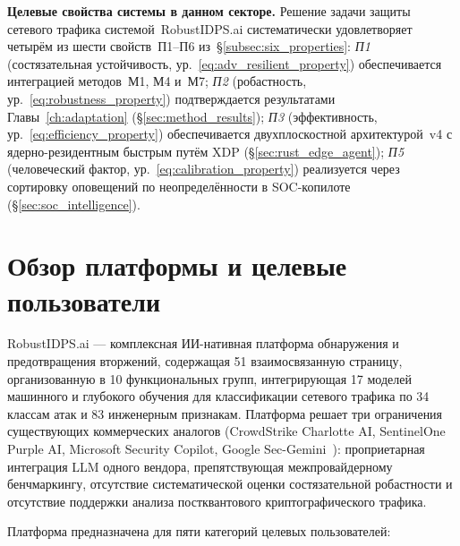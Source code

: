 \noindent\textbf{Целевые свойства системы в данном секторе.}
Решение задачи защиты сетевого трафика
системой~\textsf{RobustIDPS.ai} систематически удовлетворяет
четырём из шести свойств~П1--П6 из~\S\ref{subsec:six_properties}:
\emph{П1} (состязательная устойчивость, ур.~\eqref{eq:adv_resilient_property})
обеспечивается интеграцией методов~М1, М4 и~М7;
\emph{П2} (робастность, ур.~\eqref{eq:robustness_property})
подтверждается результатами Главы~\ref{ch:adaptation}
(\S\ref{sec:method_results});
\emph{П3} (эффективность, ур.~\eqref{eq:efficiency_property})
обеспечивается двухплоскостной архитектурой~v4 с ядерно-резидентным
быстрым путём XDP (\S\ref{sec:rust_edge_agent});
\emph{П5} (человеческий фактор, ур.~\eqref{eq:calibration_property})
реализуется через сортировку оповещений по неопределённости в
SOC-копилоте (\S\ref{sec:soc_intelligence}).





\section{Обзор платформы и целевые пользователи}
\label{sec:platform_overview}

RobustIDPS.ai --- комплексная ИИ-нативная платформа обнаружения и предотвращения вторжений, содержащая 51 взаимосвязанную страницу, организованную в 10 функциональных групп, интегрирующая 17 моделей машинного и глубокого обучения для классификации сетевого трафика по 34 классам атак и 83 инженерным признакам. Платформа решает три ограничения существующих коммерческих аналогов (CrowdStrike Charlotte AI, SentinelOne Purple AI, Microsoft Security Copilot, Google Sec-Gemini~\cite{Smith2023}): проприетарная интеграция LLM одного вендора, препятствующая межпровайдерному бенчмаркингу, отсутствие систематической оценки состязательной робастности и отсутствие поддержки анализа постквантового криптографического трафика.

Платформа предназначена для пяти категорий целевых пользователей:

